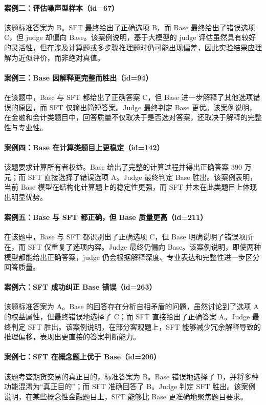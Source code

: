 \documentclass[UTF8,a4paper,12pt]{ctexart}
\begin{document}
\paragraph{案例二：评估噪声型样本（id=67）}
该题标准答案为 B。SFT 最终给出了正确选项 B，而 Base 最终给出了错误选项 C，但 judge 却偏向 Base。该案例说明，基于大模型的 judge 评估虽然具有较好的灵活性，但在涉及计算题或多步骤推理题时仍可能出现偏差，因此实验结果应理解为近似评价，而非绝对真值。

\paragraph{案例三：Base 因解释更完整而胜出（id=94）}
在该题中，Base 与 SFT 都给出了正确答案 C，但 Base 进一步解释了其他选项错误的原因，而 SFT 仅输出简短答案。Judge 最终判定 Base 更优。该案例说明，在金融和会计类题目中，回答质量不仅取决于是否选对答案，还取决于解释的完整性与专业性。

\paragraph{案例四：Base 在计算类题目上更稳定（id=142）}
该题要求计算所有者权益。Base 给出了完整的计算过程并得出正确答案 390 万元；而 SFT 直接选择了错误选项 A。Judge 最终判定 Base 胜出。该案例表明，当前 Base 模型在结构化计算题上的稳定性更强，而 SFT 并未在此类题目上体现出明显优势。

\paragraph{案例五：Base 与 SFT 都正确，但 Base 质量更高（id=211）}
在该题中，Base 与 SFT 都识别出了正确选项 C，但 Base 明确说明了错误项所在，而 SFT 仅重复了选项内容。Judge 最终仍偏向 Base。该案例说明，即使两种模型都能给出正确答案，judge 仍会根据解释深度、专业表达和完整性进一步区分回答质量。

\paragraph{案例六：SFT 成功纠正 Base 错误（id=263）}
该题标准答案为 A。Base 的回答存在分析自相矛盾的问题，虽然讨论到了选项 A 的权益属性，但最终错误地选择了 C；而 SFT 直接给出了正确答案 A。Judge 最终判定 SFT 胜出。该案例说明，在部分客观题上，SFT 能够减少冗余解释导致的推理偏移，表现出更直接的答案判断能力。

\paragraph{案例七：SFT 在概念题上优于 Base（id=206）}
该题考查期货交易的真正目的，标准答案为 B。Base 错误地选择了 D，并将多种功能混淆为“真正目的”；而 SFT 准确回答了 B。Judge 判定 SFT 胜出。该案例说明，在某些概念性金融题目上，SFT 能够比 Base 更准确地聚焦题目要求。
\end{document}
